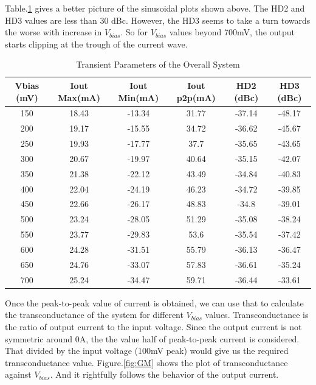 Table.\ref{tab:SINE} gives a better picture of the sinusoidal plots shown above. The HD2 and HD3 values are less than 30 dBc. However, the HD3 seems to take a turn towards the worse with increase in $V_{bias}$. So for $V_{bias}$ values beyond 700mV, the output starts clipping at the trough of the current wave.

\begin{table} [H]
\centering
\begin{tabular}{@{}cccccc@{}}
\toprule
Vbias (mV)		& Iout Max(mA)		& Iout Min(mA)	 & Iout p2p(mA) & HD2 (dBc)	&HD3 (dBc) \\ \midrule
150				& 18.43	 			& -13.34		 & 31.77		& -37.14		& -48.17	\\
200				& 19.17 			& -15.55		 & 34.72		& -36.62		& -45.67	\\
250				& 19.93 			& -17.77		 & 37.7			& -35.65		& -43.65	\\
300				& 20.67 			& -19.97		 & 40.64		& -35.15		& -42.07	\\
350				& 21.38				& -22.12		 & 43.49		& -34.84		& -40.83	\\
400				& 22.04				& -24.19		 & 46.23		& -34.72		& -39.85	\\
450				& 22.66 			& -26.17		 & 48.83		& -34.8			& -39.01	\\
500				& 23.24				& -28.05		 & 51.29		& -35.08		& -38.24	\\
550				& 23.77	 			& -29.83		 & 53.6			& -35.54		& -37.42	\\
600				& 24.28 			& -31.51		 & 55.79		& -36.13		& -36.47	\\
650				& 24.76 			& -33.07		 & 57.83		& -36.61		& -35.24	\\
700 			& 25.24 			& -34.47		 & 59.71		& -36.44		& -33.61	\\
\bottomrule
\end{tabular}
\caption{Transient Parameters of the Overall System}
\label{tab:SINE}
\end{table}

Once the peak-to-peak value of current is obtained, we can use that to calculate the transconductance of the system for different $V_{bias}$ values. Transconductance is the ratio of output current to the input voltage. Since the output current is not symmetric around 0A, the the value half of peak-to-peak current is considered. That divided by the input voltage (100mV peak) would give us the required transconductance value. Figure.\ref{fig:GM} shows the plot of transconductance against $V_{bias}$. And it rightfully follows the behavior of the output current.

